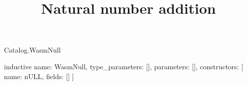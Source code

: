 \begin{lexlean}{Catalog.WasmNull}
\title{Natural number addition}
\begin{semanticmodule}
inductive{
  name: WasmNull,
  type_parameters: [],
  parameters: [],
  constructors: [
    {name: nULL, fields: []}
  ]
}
\end{semanticmodule}
\end{lexlean}
